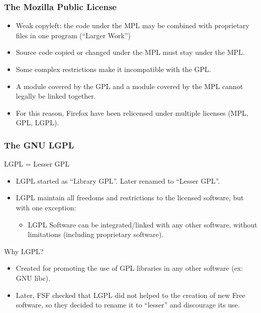 
\begin{frame}
\frametitle{The Mozilla Public License}

\begin{itemize}
\item Weak copyleft: the code under the MPL may be combined with proprietary files in one program (``Larger Work'')
\item Source code copied or changed under the MPL must stay under the MPL.
\item Some complex restrictions make it incompatible with the GPL.
\item A module covered by the GPL and a module covered by the MPL cannot legally be linked together.
\item For this reason, Firefox have been relicensed under multiple licenses (MPL, GPL, LGPL).
\end{itemize}

\end{frame}


\begin{frame}
\frametitle{The GNU LGPL}

\begin{center}
LGPL = Lesser GPL
\end{center}

\begin{itemize}
\item LGPL started as ``Library GPL''. Later renamed to ``Lesser
  GPL''.
\item LGPL maintain all freedoms and restrictions to the licensed
  software, but with one exception:
\begin{itemize}
\item LGPL Software can be integrated/linked with any other software, without
  limitations (including proprietary software).
\end{itemize}
\end{itemize}

Why LGPL?
\begin{itemize}
\item Created for promoting the use of GPL libraries in any other
  software (ex: GNU libc).
\item Later, FSF checked that LGPL did not helped to the creation of
  new Free software, so they decided to rename it to ``lesser'' and
  discourage its use.
\end{itemize}

\end{frame}


